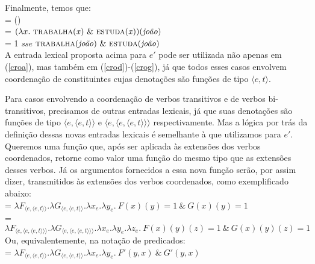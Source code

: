\n Finalmente, temos que:\\

\n {} = ()\\


\n {} = $(\lambda x.\ \predica{trabalha}{x}\ \&\ \predica{estuda}{x})(\text{\textit{joão}})$\\

\n {} = 1 \textit{sse} $\predica{trabalha}{joão}\ \&\ \predica{estuda}{joão}$\\

A entrada lexical proposta acima para $e'$ pode ser utilizada não
apenas em (\ref{croa}), mas também em (\ref{crod})-(\ref{crog}),
já que todos esses casos envolvem coordena\-ção de constituintes
cujas denota\-çõ\-es são fun\-çõ\-es de tipo $\langle e,t\rangle$.

Para casos envolvendo a coordena\-ção de verbos transitivos e de
verbos bi-transitivos, precisamos de outras entradas lexicais, já
que suas denota\-çõ\-es são fun\-çõ\-es de tipo $\langle e,\langle
e,t\rangle\rangle$ e $\langle e,\langle e, \langle
e,t\rangle\rangle\rangle$ respectivamente. Mas a lógica por trás
da defini\-ção dessas novas entradas lexicais é semelhante à que
utilizamos para $e'$. Queremos uma fun\-ção que, após ser aplicada
às extensões dos verbos coordenados, retorne como valor uma
fun\-ção do mesmo tipo que as extensões desses verbos. Já os
argumentos fornecidos a essa nova fun\-ção serão, por assim dizer,
transmitidos às extensões dos verbos coordenados, como
exemplificado
abaixo:\\

\n {} = $\lambda F_{\langle e,\langle
e,t\rangle\rangle}.\lambda G_{\langle e,\langle
e,t\rangle\rangle}.\lambda x_{e}.\lambda y_{e}.\ F(x)(y)=1\ \&\
G(x)(y)=1$\\

\n {} = $\lambda F_{\langle e,\langle e, \langle
e,t\rangle\rangle\rangle}.\lambda G_{\langle e,\langle e, \langle
e,t\rangle\rangle\rangle}.\lambda x_{e}.\lambda y_{e}.\lambda
z_{e}.\ F(x)(y)(z)=1\ \&\ G(x)(y)(z)=1$\\


\n Ou, equivalentemente, na notação de predicados:\\


\n {} = $\lambda F_{\langle e,\langle
	e,t\rangle\rangle}.\lambda G_{\langle e,\langle
	e,t\rangle\rangle}.\lambda x_{e}.\lambda y_{e}.\ F'(y,x)\ \&\
G'(y,x)$\\

